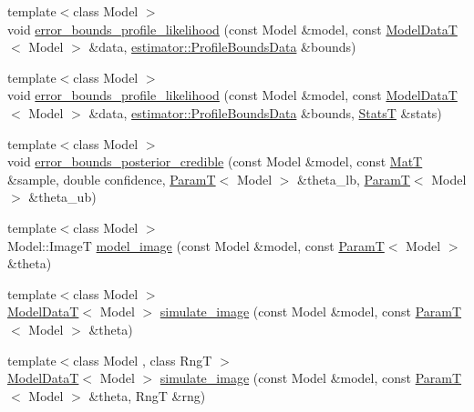 \begin{DoxyCompactItemize}
\item 
{\footnotesize template$<$class Model $>$ }\\void \hyperlink{namespacemappel_1_1methods_a11dcb2ad2094e38c03bfc6f81aaf0876}{error\+\_\+bounds\+\_\+profile\+\_\+likelihood} (const Model \&model, const \hyperlink{namespacemappel_a97f050df953605381ae9c901c3b125f1}{Model\+DataT}$<$ Model $>$ \&data, \hyperlink{structmappel_1_1estimator_1_1ProfileBoundsData}{estimator\+::\+Profile\+Bounds\+Data} \&bounds)
\item 
{\footnotesize template$<$class Model $>$ }\\void \hyperlink{namespacemappel_1_1methods_a294dca5e0f48ce78385e62c521ec695a}{error\+\_\+bounds\+\_\+profile\+\_\+likelihood} (const Model \&model, const \hyperlink{namespacemappel_a97f050df953605381ae9c901c3b125f1}{Model\+DataT}$<$ Model $>$ \&data, \hyperlink{structmappel_1_1estimator_1_1ProfileBoundsData}{estimator\+::\+Profile\+Bounds\+Data} \&bounds, \hyperlink{namespacemappel_a04ab395b0cf82c4ce68a36b2212649a5}{StatsT} \&stats)
\item 
{\footnotesize template$<$class Model $>$ }\\void \hyperlink{namespacemappel_1_1methods_afcb08618a6aa5907d991cc9128474121}{error\+\_\+bounds\+\_\+posterior\+\_\+credible} (const Model \&model, const \hyperlink{namespacemappel_a7091ab87c528041f7e2027195fad8915}{MatT} \&sample, double confidence, \hyperlink{namespacemappel_a667925cb0d6c0e49f2f035cc5a9a6857}{ParamT}$<$ Model $>$ \&theta\+\_\+lb, \hyperlink{namespacemappel_a667925cb0d6c0e49f2f035cc5a9a6857}{ParamT}$<$ Model $>$ \&theta\+\_\+ub)
\item 
{\footnotesize template$<$class Model $>$ }\\Model\+::\+ImageT \hyperlink{namespacemappel_1_1methods_ab7601760f76a0f3d283aaa1b21d4f5b5}{model\+\_\+image} (const Model \&model, const \hyperlink{namespacemappel_a667925cb0d6c0e49f2f035cc5a9a6857}{ParamT}$<$ Model $>$ \&theta)
\item 
{\footnotesize template$<$class Model $>$ }\\\hyperlink{namespacemappel_a97f050df953605381ae9c901c3b125f1}{Model\+DataT}$<$ Model $>$ \hyperlink{namespacemappel_1_1methods_a1ee59254cbbfc8839f2500df4d425126}{simulate\+\_\+image} (const Model \&model, const \hyperlink{namespacemappel_a667925cb0d6c0e49f2f035cc5a9a6857}{ParamT}$<$ Model $>$ \&theta)
\item 
{\footnotesize template$<$class Model , class RngT $>$ }\\\hyperlink{namespacemappel_a97f050df953605381ae9c901c3b125f1}{Model\+DataT}$<$ Model $>$ \hyperlink{namespacemappel_1_1methods_a2694b3a7301ff1b0b5e5a585088022f9}{simulate\+\_\+image} (const Model \&model, const \hyperlink{namespacemappel_a667925cb0d6c0e49f2f035cc5a9a6857}{ParamT}$<$ Model $>$ \&theta, RngT \&rng)

\end{DoxyCompactItemize}
